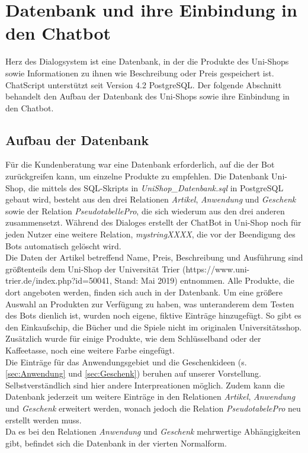 \chapter{Datenbank und ihre Einbindung in den Chatbot}
\label{sec:DBuEinbindung}

Herz des Dialogsystem ist eine Datenbank, in der die Produkte des Uni-Shops sowie Informationen zu ihnen wie Beschreibung oder Preis gespeichert ist. ChatScript unterstützt seit Version 4.2 PostgreSQL.
Der folgende Abschnitt behandelt den Aufbau der Datenbank des Uni-Shops sowie ihre Einbindung in den Chatbot.\\


\section{Aufbau der Datenbank}
\label{sec:DB}

Für die Kundenberatung war eine Datenbank erforderlich, auf die der Bot zurückgreifen kann, um einzelne Produkte zu empfehlen. Die Datenbank Uni-Shop, die mittels des SQL-Skripts in \textit {UniShop\_Datenbank.sql} in PostgreSQL gebaut wird, besteht aus den drei Relationen \textit{Artikel}, \textit{Anwendung} und \textit{Geschenk} sowie der Relation \textit{PseudotabellePro}, die sich wiederum aus den drei anderen zusammensetzt. Während des Dialoges erstellt der ChatBot in Uni-Shop noch für jeden Nutzer eine weitere Relation, \textit{mystringXXXX}, die vor der Beendigung des Bots automatisch gelöscht wird.\\
Die Daten der Artikel betreffend Name, Preis, Beschreibung und Ausführung sind größtenteils dem Uni-Shop der Universität Trier (https://www.uni-trier.de/index.php?id=50041, Stand: Mai 2019) entnommen. Alle Produkte, die dort angeboten werden, finden sich auch in der Datenbank. Um eine größere Auswahl an Produkten zur Verfügung zu haben, was unteranderem dem Testen des Bots dienlich ist, wurden noch eigene, fiktive Einträge hinzugefügt. So gibt es den Einkaufschip, die Bücher und die Spiele nicht im originalen Universitätsshop. Zusätzlich wurde für einige Produkte, wie dem Schlüsselband oder der Kaffeetasse, noch eine weitere Farbe eingefügt.\\
Die Einträge für das Anwendungsgebiet und die Geschenkideen (s. \ref{sec:Anwendung} und \ref{sec:Geschenk}) beruhen auf unserer Vorstellung. Selbstverständlich sind hier andere Interpreationen möglich. Zudem kann die Datenbank jederzeit um weitere Einträge in den Relationen \textit{Artikel}, \textit{Anwendung} und \textit{Geschenk} erweitert werden, wonach jedoch die Relation \textit{PseudotabelePro} neu erstellt werden muss.\\
Da es bei den Relationen \textit{Anwendung} und \textit{Geschenk} mehrwertige Abhängigkeiten gibt, befindet sich die Datenbank in der vierten Normalform.\\


